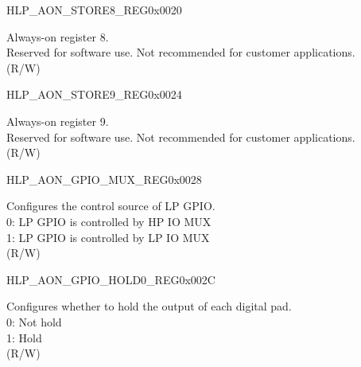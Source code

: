 \begin{register}{H}{LP\_AON\_STORE8\_REG}{0x0020}\label{regdesc:LPAONSTORE8REG}
%
\regnewline%
\begin{regdesc}\begin{reglist}
\label{fielddesc:LPAONLPAONSTORE8}\item [LP\_AON\_LP\_AON\_STORE8] Always-on register 8.\\
Reserved for software use. Not recommended for customer applications.\\
(R/W)
\end{reglist}\end{regdesc}
\end{register}

\begin{register}{H}{LP\_AON\_STORE9\_REG}{0x0024}\label{regdesc:LPAONSTORE9REG}
%
\regnewline%
\begin{regdesc}\begin{reglist}
\label{fielddesc:LPAONLPAONSTORE9}\item [LP\_AON\_LP\_AON\_STORE9] Always-on register 9.\\
Reserved for software use. Not recommended for customer applications.\\
(R/W)
\end{reglist}\end{regdesc}
\end{register}

\begin{register}{H}{LP\_AON\_GPIO\_MUX\_REG}{0x0028}\label{regdesc:LPAONGPIOMUXREG}
%
%
\regnewline%
\begin{regdesc}\begin{reglist}
\label{fielddesc:LPAONGPIOMUXSEL}\item [LP\_AON\_GPIO\_MUX\_SEL] Configures the control source of LP GPIO.\\
0: LP GPIO is controlled by HP IO MUX\\
1: LP GPIO is controlled by LP IO MUX\\
(R/W)
\end{reglist}\end{regdesc}
\end{register}

\begin{register}{H}{LP\_AON\_GPIO\_HOLD0\_REG}{0x002C}\label{regdesc:LPAONGPIOHOLD0REG}
%
\regnewline%
\begin{regdesc}\begin{reglist}
\label{fielddesc:LPAONGPIOHOLD0}\item [LP\_AON\_GPIO\_HOLD0] Configures whether to hold the output of each digital pad.\\
0: Not hold\\
1: Hold\\
(R/W)
\end{reglist}\end{regdesc}
\end{register}

